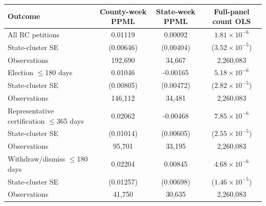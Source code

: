 \begin{tabular}{lccc}
\toprule
Outcome & County-week PPML & State-week PPML & Full-panel count OLS \\
\midrule
All RC petitions & 0.01119 & 0.00092 & $1.81\times 10^{-6}$ \\
\quad State-cluster SE & (0.00646) & (0.00404) & ($3.52\times 10^{-5}$) \\
\quad Observations & 192,690 & 34,667 & 2,260,083 \\
Election $\leq$180 days & 0.01046 & -0.00165 & $5.18\times 10^{-6}$ \\
\quad State-cluster SE & (0.00805) & (0.00472) & ($2.82\times 10^{-5}$) \\
\quad Observations & 146,112 & 34,481 & 2,260,083 \\
Representative certification $\leq$365 days & 0.02062 & -0.00468 & $7.85\times 10^{-6}$ \\
\quad State-cluster SE & (0.01014) & (0.00605) & ($2.55\times 10^{-5}$) \\
\quad Observations & 95,701 & 33,195 & 2,260,083 \\
Withdraw/dismiss $\leq$180 days & 0.02204 & 0.00845 & $4.68\times 10^{-6}$ \\
\quad State-cluster SE & (0.01257) & (0.00698) & ($1.46\times 10^{-5}$) \\
\quad Observations & 41,750 & 30,635 & 2,260,083 \\
\bottomrule
\end{tabular}
